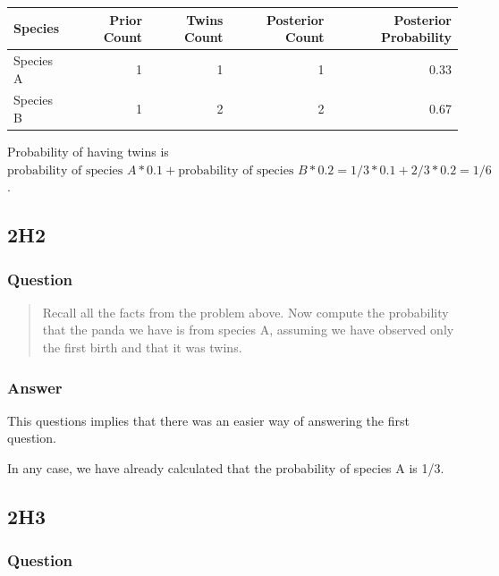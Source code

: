 \documentclass[
]{book}
\begin{document}
\begin{tabular}{l|r|r|r|r}
\hline
Species & Prior Count & Twins Count & Posterior Count & Posterior Probability\\
\hline
Species A & 1 & 1 & 1 & 0.33\\
\hline
Species B & 1 & 2 & 2 & 0.67\\
\hline
\end{tabular}

Probability of having twins is \(\text{probability of species } A * 0.1 + \text{probability of species } B * 0.2 = 1/3 * 0.1 + 2/3 * 0.2 = 1/6\).

\hypertarget{h2}{%
\subsection*{2H2}\label{h2}}

\hypertarget{question-12}{%
\subsubsection*{Question}\label{question-12}}

\begin{quote}
Recall all the facts from the problem above. Now compute the probability that the panda we have is from species A, assuming we have observed only the first birth and that it was twins.
\end{quote}

\hypertarget{answer-12}{%
\subsubsection*{Answer}\label{answer-12}}

This questions implies that there was an easier way of answering the first question.

In any case, we have already calculated that the probability of species A is 1/3.

\hypertarget{h3}{%
\subsection*{2H3}\label{h3}}

\hypertarget{question-13}{%
\subsubsection*{Question}\label{question-13}}
\end{document}
